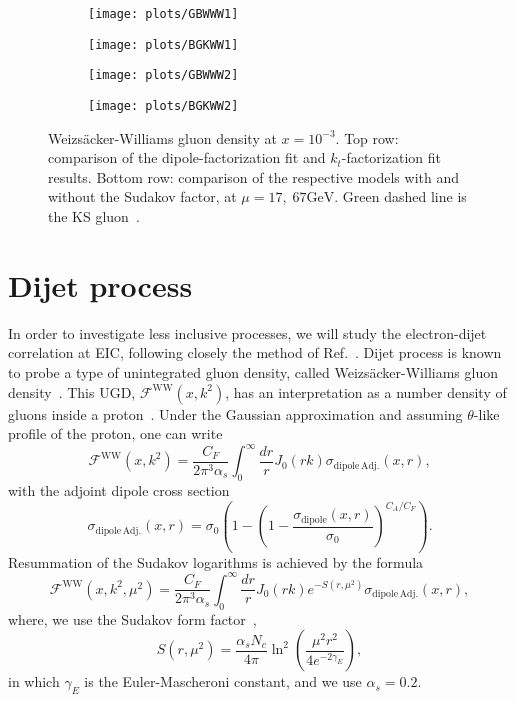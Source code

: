 \documentclass[a4,12pt]{article}
\newcommand{\fww}[0]{\mathcal{F}^{\mathrm{WW}}}
\newcommand{\sdp}[0]{\sigma_{\mathrm{dipole}}}
\newcommand{\sdpa}[0]{\sigma_{\mathrm{dipole\,Adj.}}}
\begin{document}
	\begin{figure}[t]
		\begin{subfigure}{0.5\textwidth}
			\texttt{[image: plots/GBWWW1]} 
		\end{subfigure}
		\begin{subfigure}{0.5\textwidth}
			\texttt{[image: plots/BGKWW1]} 
		\end{subfigure}
		\begin{subfigure}{0.5\textwidth}
			\texttt{[image: plots/GBWWW2]} 
		\end{subfigure}
		\begin{subfigure}{0.5\textwidth}
			\texttt{[image: plots/BGKWW2]} 
		\end{subfigure}
		\caption{\footnotesize Weizs\"acker-Williams gluon density at $x=10^{-3}$. Top row: comparison of the dipole-factorization fit and $k_t$-factorization fit results. Bottom row: comparison of the respective models with and without the Sudakov factor, at $\mu=17,\;67 \mathrm{GeV}$. Green dashed line is the KS gluon~\cite{vanHameren:2021sqc}. }
		\label{fig:ww}
	\end{figure}
\section{Dijet process}
In order to investigate less inclusive processes, we will study the electron-dijet correlation at EIC, following closely the method of Ref.~\cite{vanHameren:2021sqc}. 
Dijet process is known to probe a type of unintegrated gluon density, called Weizs\"acker-Williams gluon density~\cite{Dominguez:2010xd,Dominguez:2011wm,Xiao:2017ggh}.
This UGD, $\fww(x,k^2)$, has an interpretation as a number density of gluons inside a proton~\cite{Dominguez:2010xd,Dominguez:2011wm}. Under the Gaussian approximation and assuming $\theta$-like profile of the proton, one can write~\cite{vanHameren:2016ftb,Xiao:2017ggh,Dominguez:2010xd,Dominguez:2011wm}
\begin{equation}
\fww(x,k^2)= \frac{C_F}{2\pi^3\alpha_s}\int^\infty_0\frac{dr}{r}J_0(r k) \sdpa(x,r),
\end{equation} 	
with the adjoint dipole cross section
\begin{equation}
\sdpa(x,r)=\sigma_0\left( 1-\left(1-\frac{\sdp(x,r)}{\sigma_0}\right)^{C_A/C_F}\right).
\label{eq:ww}
\end{equation}
Resummation of the Sudakov logarithms is achieved by the formula~\cite{Xiao:2017yya}
\begin{equation}
	\fww(x,k^2,\mu^2)= \frac{C_F}{2\pi^3\alpha_s}\int^\infty_0\frac{dr}{r}J_0(r k) e^{-S(r,\mu^2)} \sdpa(x,r),
	\label{eq:ww-sud}
\end{equation}
where, we use the Sudakov form factor~\cite{Mueller:2013wwa,Xiao:2017yya},
\begin{equation}
	S(r,\mu^2)=\frac{\alpha_s N_c}{4\pi}\ln^2\left(\frac{\mu^2r^2}{4e^{-2\gamma_E}}\right),
\end{equation}
in which $\gamma_E$ is the Euler-Mascheroni constant, and we use $\alpha_s=0.2$. 
 
\end{document}
